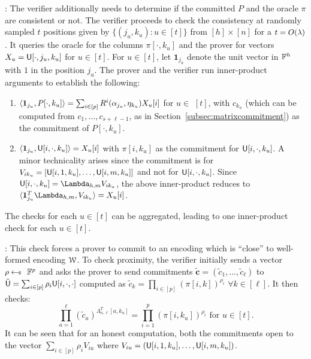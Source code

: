 : The verifier additionally needs to determine if the committed $P$ and the oracle $\pi$ are consistent or not. The verifier proceeds to check the consistency at randomly sampled $t$ positions given by $\{(j_u,k_u): u\in [t]\}$ from $[h] \times [n]$ for a $t=O(\secpar)$. It queries the oracle for the columns $\pi[\cdot,k_u]$ and the prover for vectors $X_u = \ewit[\cdot,j_u,k_u]$ for $u\in [t]$.  For $u\in [t]$, let %
$\bm{1}_{j_u}$ denote the unit vector in $\FF^h$ with $1$ in the position $j_u$. The prover and the verifier run inner-product arguments to establish the following:
\begin{enumerate}[{\rm 1.}]
	\item $\innp{\bm{1}_{j_u}}{P[\cdot,k_u]}= \sum_{i \in [p]} R^i(\alpha_{j_u},\eta_{k_u}) X_u[i]$  for $u\in$ $[t]$, with $c_{k_u}$ (which can be computed from $c_1,\ldots,c_{s+\ell-1}$, as in Section~\ref{subsec:matrixcommitment})  as the commitment of  $P[\cdot,k_u]$. 
	\item $\innp{\bm{1}_{j_u}}{\ewit[i,\cdot,k_u]} = X_u[i]$ with $\pi[i,k_u]$ as the commitment for $\ewit[i,\cdot,k_u]$. A minor technicality arises since the commitment is for $V_{ik_u} = [\ewit[i,1,k_u], \ldots, \ewit[i,m,k_u]]$ and not for  $\ewit[i,\cdot,k_u]$. Since $\ewit[i,\cdot,k_u] = \Lambda_{h,m}V_{ik_u}$,  the above inner-product reduces to 
	$ \innp{\bm{1}^T_{j_u}\Lambda_{h,m}}{ V_{ik_u}} = X_u[i]$. 	
\end{enumerate}
The checks for each $u\in [t]$ can be aggregated, leading to one inner-product check for each $u\in [t]$.

\smallskip

: This check forces a prover to commit to an encoding which is ``close'' to well-formed encoding $\mc{W}$. To check proximity, the verifier initially  sends a vector $\rho\sample \FF^p$ and asks the prover to send commitments $\tilde{\bm{c}} = (\tilde{c}_1,\ldots,\tilde{c}_\ell)$ to $\tilde{\ewit}=\sum_{i\in 	[p]}\rho_i\ewit[i,\cdot,\cdot]$ computed as $\tilde{c}_k = \prod_{i\in[p]}(\pi[i,k])^{\rho_i}$ $\forall k\in[\ell]$. It then checks:
\begin{equation}\label{eq:proxchecks}
\prod_{a=1}^\ell(\tilde{c}_a)^{\Lambda^T_{n,\ell}[a,k_u]}=\prod_{i=1}^p(\pi[i,k_u])^{\rho_i} \text{ for } u\in [t].
\end{equation} 
It can be seen that for an honest computation, both the commitments open to the vector $\sum_{i\in [p]}\rho_iV_{iu}$ where $V_{iu}=(\ewit[i,1,k_u],\ldots,\ewit[i,m,k_u])$.
